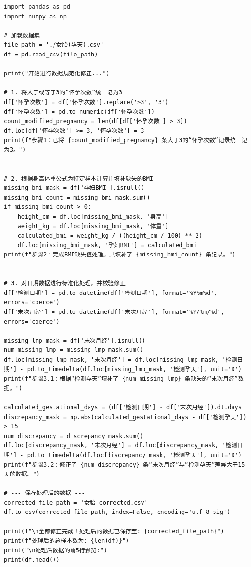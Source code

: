 \documentclass[a4paper, oneside, 12pt]{article}
\begin{document}
\begin{lstlisting}[style=python]
import pandas as pd
import numpy as np

# 加载数据集
file_path = './女胎(孕天).csv'
df = pd.read_csv(file_path)

print("开始进行数据规范化修正...")

# 1. 将大于或等于3的“怀孕次数”统一记为3
df['怀孕次数'] = df['怀孕次数'].replace('≥3', '3')
df['怀孕次数'] = pd.to_numeric(df['怀孕次数'])
count_modified_pregnancy = len(df[df['怀孕次数'] > 3])
df.loc[df['怀孕次数'] >= 3, '怀孕次数'] = 3
print(f"步骤1：已将 {count_modified_pregnancy} 条大于3的“怀孕次数”记录统一记为3。")


# 2. 根据身高体重公式为特定样本计算并填补缺失的BMI
missing_bmi_mask = df['孕妇BMI'].isnull()
missing_bmi_count = missing_bmi_mask.sum()
if missing_bmi_count > 0:
    height_cm = df.loc[missing_bmi_mask, '身高']
    weight_kg = df.loc[missing_bmi_mask, '体重']
    calculated_bmi = weight_kg / ((height_cm / 100) ** 2)
    df.loc[missing_bmi_mask, '孕妇BMI'] = calculated_bmi
print(f"步骤2：完成BMI缺失值处理，共填补了 {missing_bmi_count} 条记录。")


# 3. 对日期数据进行标准化处理，并校验修正
df['检测日期'] = pd.to_datetime(df['检测日期'], format='%Y%m%d', errors='coerce')
df['末次月经'] = pd.to_datetime(df['末次月经'], format='%Y/%m/%d', errors='coerce')

missing_lmp_mask = df['末次月经'].isnull()
num_missing_lmp = missing_lmp_mask.sum()
df.loc[missing_lmp_mask, '末次月经'] = df.loc[missing_lmp_mask, '检测日期'] - pd.to_timedelta(df.loc[missing_lmp_mask, '检测孕天'], unit='D')
print(f"步骤3.1：根据“检测孕天”填补了 {num_missing_lmp} 条缺失的“末次月经”数据。")

calculated_gestational_days = (df['检测日期'] - df['末次月经']).dt.days
discrepancy_mask = np.abs(calculated_gestational_days - df['检测孕天']) > 15
num_discrepancy = discrepancy_mask.sum()
df.loc[discrepancy_mask, '末次月经'] = df.loc[discrepancy_mask, '检测日期'] - pd.to_timedelta(df.loc[discrepancy_mask, '检测孕天'], unit='D')
print(f"步骤3.2：修正了 {num_discrepancy} 条“末次月经”与“检测孕天”差异大于15天的数据。")

# --- 保存处理后的数据 ---
corrected_file_path = '女胎_corrected.csv'
df.to_csv(corrected_file_path, index=False, encoding='utf-8-sig')

print(f"\n全部修正完成！处理后的数据已保存至: {corrected_file_path}")
print(f"处理后的总样本数为: {len(df)}")
print("\n处理后数据的前5行预览:")
print(df.head())
\end{lstlisting}
\end{document}
